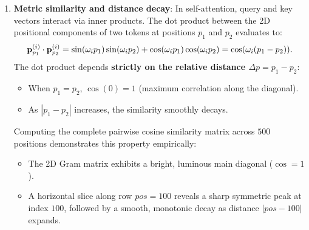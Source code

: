 \documentclass[../../main.tex]{subfiles}
\begin{document}
\begin{enumerate}
\begin{proof}
    Expressing this system in matrix notation yields Equation~\eqref{eq:linear_pe_rotation}. Because the rotation matrix $\mM_{i, k}$ depends strictly on offset $k$ and is independent of absolute position $pos$, linear attention projection layers ($\mW_Q, \mW_K$) can easily learn to attend to relative positions. $\blacksquare$
    \end{proof}
    \item \textbf{Metric similarity and distance decay}:
    In self-attention, query and key vectors interact via inner products. The dot product between the 2D positional components of two tokens at positions $p_1$ and $p_2$ evaluates to:
    \begin{equation}
    \label{eq:pe_dot_product}
    \mathbf{p}_{p_1}^{(i)} \cdot \mathbf{p}_{p_2}^{(i)} = \sin(\omega_i p_1)\sin(\omega_i p_2) + \cos(\omega_i p_1)\cos(\omega_i p_2) = \cos(\omega_i (p_1 - p_2)).
    \end{equation}
    The dot product depends \textbf{strictly on the relative distance $\Delta p = p_1 - p_2$}:
    \begin{itemize}
        \item When $p_1 = p_2$, $\cos(0) = 1$ (maximum correlation along the diagonal).
        \item As $|p_1 - p_2|$ increases, the similarity smoothly decays.
    \end{itemize}
    Computing the complete pairwise cosine similarity matrix across $500$ positions demonstrates this property empirically:
    \begin{itemize}
        \item The 2D Gram matrix exhibits a bright, luminous main diagonal ($\cos = 1$).
        \item A horizontal slice along row $pos = 100$ reveals a sharp symmetric peak at index $100$, followed by a smooth, monotonic decay as distance $|pos - 100|$ expands.
    \end{itemize}
\end{enumerate}
\end{document}
